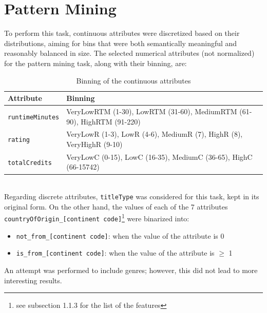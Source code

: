 \chapter{Pattern Mining}
\label{ch:capitolo2}
To perform this task, continuous attributes were discretized based on their distributions, 
aiming for bins that were both semantically meaningful and reasonably balanced in size. 
The selected numerical attributes (not normalized) for the pattern mining task, along with their binning, are:
\begin{table}[h]
\centering
\begin{tabular}{ll}
\toprule
\textbf{Attribute} & \textbf{Binning} \\
\midrule
\texttt{runtimeMinutes} & VeryLowRTM (1-30), LowRTM (31-60), MediumRTM (61-90), HighRTM (91-220) \\
\texttt{rating} & VeryLowR (1-3), LowR (4-6), MediumR (7), HighR (8), VeryHighR (9-10) \\
\texttt{totalCredits} & VeryLowC (0-15), LowC (16-35), MediumC (36-65), HighC (66-15742) \\
\bottomrule
\end{tabular}
\caption{Binning of the continuous attributes}
\end{table}\\
Regarding discrete attributes, \texttt{titleType} was considered for this task, kept in its original form. 
On the other hand, the values of each of the 7 attributes \texttt{countryOfOrigin\_[continent code]}\footnote{see subsection 1.1.3 for the list of the features} were binarized into:
\begin{itemize}
    \item \texttt{not\_from\_[continent code]}: when the value of the attribute is 0
    \item \texttt{is\_from\_[continent code]}: when the value of the attribute is $\geq$ 1
\end{itemize}
An attempt was performed to include genres; however, this did not lead to more interesting results.

